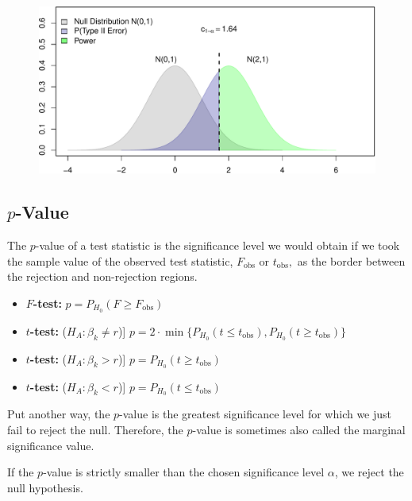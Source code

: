 \documentclass[
  letterpaper,
  DIV=11,
  numbers=noendperiod]{scrreprt}
\providecommand{\tightlist}{%
  \setlength{\itemsep}{0pt}\setlength{\parskip}{0pt}}\usepackage{longtable,booktabs,array}
\theoremstyle{definition}
\theoremstyle{plain}
\theoremstyle{plain}
\theoremstyle{remark}
\begin{document}
\begin{figure}

{\centering \includegraphics{./05-Small-Sample-Inference_files/figure-pdf/unnamed-chunk-9-1.pdf}

}

\end{figure}

\hypertarget{p-value}{%
\subsection{\texorpdfstring{\(p\)-Value}{p-Value}}\label{p-value}}

The \(p\)-value of a test statistic is the significance level we would
obtain if we took the sample value of the observed test statistic,
\(F_{\text{obs}}\) or \(t_{\text{obs}},\) as the border between the
rejection and non-rejection regions.

\begin{itemize}
\tightlist
\item
  \textbf{\(F\)-test:} \(p=P_{H_0}(F\geq F_{\text{obs}})\)
\item
  \textbf{\(t\)-test:} (\(H_A:\beta_k\neq r\)){]}
  \(p=2\cdot\min\{P_{H_0}(t\leq t_{\text{obs}}),P_{H_0}(t\geq t_{\text{obs}})\}\)
\item
  \textbf{\(t\)-test:} (\(H_A:\beta_k> r\)){]}
  \(p=P_{H_0}(t\geq t_{\text{obs}})\)
\item
  \textbf{\(t\)-test:} (\(H_A:\beta_k< r\)){]}
  \(p=P_{H_0}(t\leq t_{\text{obs}})\)
\end{itemize}

Put another way, the \(p\)-value is the greatest significance level for
which we just fail to reject the null. Therefore, the \(p\)-value is
sometimes also called the marginal significance value.

If the \(p\)-value is strictly smaller than the chosen significance
level \(\alpha\), we reject the null hypothesis.
\end{document}
